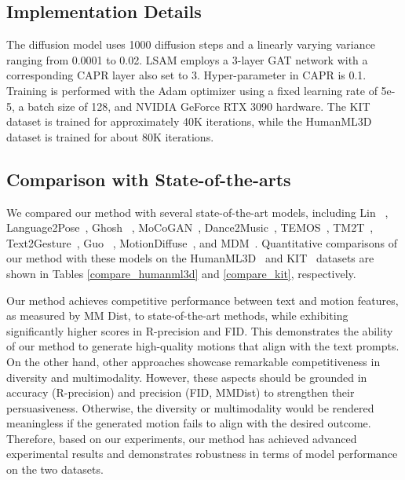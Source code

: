 \documentclass[10pt,twocolumn,letterpaper]{article}
\begin{document}
\subsection{Implementation Details}
\label{sec:Implementation Details}

The diffusion model uses 1000 diffusion steps and a linearly varying variance  ranging from 0.0001 to 0.02. LSAM employs a 3-layer GAT network with a corresponding CAPR layer also set to 3. Hyper-parameter  in CAPR is 0.1. Training is performed with the Adam optimizer using a fixed learning rate of 5e-5, a batch size of 128, and NVIDIA GeForce RTX 3090 hardware. The KIT dataset is trained for approximately 40K iterations, while the HumanML3D dataset is trained for about 80K iterations.






\subsection{Comparison with State-of-the-arts}
\label{sec:Comparison with State-of-the-arts}

We compared our method with several state-of-the-art models, including Lin \etal~\cite{lin:vigil18}, Language2Pose~\cite{ahuja2019language2pose}, Ghosh \etal~\cite{ghosh2021synthesis}, MoCoGAN~\cite{tulyakov2018mocogan}, Dance2Music~\cite{lee2019dancing}, TEMOS~\cite{petrovich2022temos}, TM2T~\cite{guo2022tm2t}, Text2Gesture~\cite{bhattacharya2021text2gestures}, Guo \etal~\cite{guo2022generating}, MotionDiffuse~\cite{zhang2022motiondiffuse}, and MDM~\cite{tevet2022human}. Quantitative comparisons of our method with these models on the HumanML3D~\cite{guo2022generating} and KIT~\cite{plappert2016kit} datasets are shown in Tables \ref{compare_humanml3d} and \ref{compare_kit}, respectively. 



Our method achieves competitive performance between text and motion features, as measured by MM Dist, to state-of-the-art methods, while exhibiting significantly higher scores in R-precision and FID. This demonstrates the ability of our method to generate high-quality motions that align with the text prompts. On the other hand, other approaches showcase remarkable competitiveness in diversity and multimodality. However, these aspects should be grounded in accuracy (R-precision) and precision (FID, MMDist) to strengthen their persuasiveness. Otherwise, the diversity or multimodality would be rendered meaningless if the generated motion fails to align with the desired outcome. Therefore, based on our experiments, our method has achieved advanced experimental results and demonstrates robustness in terms of model performance on the two datasets. 
\end{document}

